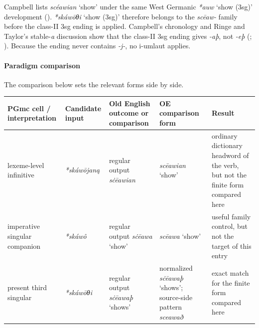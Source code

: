\documentclass[
  british,
  a4paper,
]{article}
\newcounter{none} %
\providecommand{\Recon}[1]{\emph{*#1}}
\begin{document}
Campbell lists {\emph{scéawian}} `show' under the same West Germanic
\Recon{auw} `show (3sg)' development
(). \Recon{skáwōθi}
`show (3sg)' therefore belongs to the \emph{scēaw-} family before the
class-II 3sg ending is applied. Campbell's chronology and Ringe and
Taylor's stable-\emph{a} discussion show that the class-II 3sg ending
gives \emph{-aþ}, not \emph{-eþ} (; ). Because the ending never contains \emph{-j-}, no i-umlaut
applies.

\paragraph{Paradigm comparison}\label{paradigm-comparison-26}

The comparison below sets the relevant forms side by side.

{\def\LTcaptype{none} %
\begin{longtable}[]{@{}
  >{\raggedright\arraybackslash}p{}
  >{\raggedright\arraybackslash}p{}
  >{\raggedright\arraybackslash}p{}
  >{\raggedright\arraybackslash}p{}
  >{\raggedright\arraybackslash}p{}@{}}
\toprule\noalign{}
\begin{minipage}[b]{\linewidth}\raggedright
PGmc cell / interpretation
\end{minipage} & \begin{minipage}[b]{\linewidth}\raggedright
Candidate input
\end{minipage} & \begin{minipage}[b]{\linewidth}\raggedright
Old English outcome or comparison
\end{minipage} & \begin{minipage}[b]{\linewidth}\raggedright
OE comparison form
\end{minipage} & \begin{minipage}[b]{\linewidth}\raggedright
Result
\end{minipage} \\
\midrule\noalign{}
\endhead
\bottomrule\noalign{}
\endlastfoot
lexeme-level infinitive & {\emph{*skáwōjaną}} & regular output
{\emph{sċēawian}} & {\emph{scēawian}} `show' & ordinary dictionary
headword of the verb, but not the finite form compared here \\
imperative singular companion & {\emph{*skáwô}} & regular output
{\emph{sċēawa}} `show' & {\emph{scēawa}} `show' & useful family control,
but not the target of this entry \\
present third singular & {\emph{*skáwōθi}} & regular output
{\emph{sċēawaþ}} `shows' & normalized {\emph{sċēawaþ}} `shows';
source-side pattern \emph{sceawað} & exact match for the finite form
compared here \\
\end{longtable}
}
\end{document}
